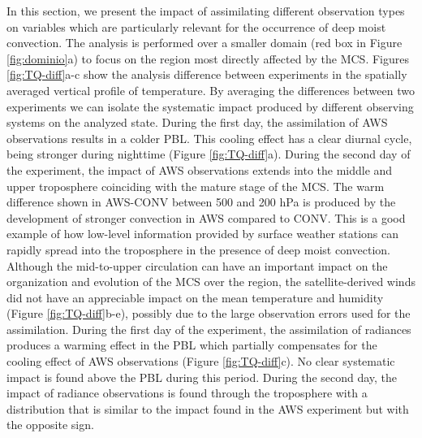 \documentclass[authoryear,preprint,review,12pt]{elsarticle} %
\begin{document}
In this section, we present the impact of assimilating different observation types on variables which are particularly relevant for the occurrence of deep moist convection. The analysis is performed over a smaller domain (red box in Figure \ref{fig:dominio}a) to focus on the region most directly affected by the MCS. Figures \ref{fig:TQ-diff}a-c show the analysis difference between experiments in the spatially averaged vertical profile of temperature. By averaging the differences between two experiments we can isolate the systematic impact produced by different observing systems on the analyzed state. During the first day, the assimilation of AWS observations results in a colder PBL. This cooling effect has a clear diurnal cycle, being stronger during nighttime (Figure \ref{fig:TQ-diff}a). During the second day of the experiment, the impact of AWS observations extends into the middle and upper troposphere coinciding with the mature stage of the MCS. The warm difference shown in AWS-CONV between 500 and 200 hPa is produced by the development of stronger convection in AWS compared to CONV. This is a good example of how low-level information provided by surface weather stations can rapidly spread into the troposphere in the presence of deep moist convection. Although the mid-to-upper circulation can have an important impact on the organization and evolution of the MCS over the region, the satellite-derived winds did not have an appreciable impact on the mean temperature and humidity (Figure \ref{fig:TQ-diff}b-e), possibly due to the large observation errors used for the assimilation.
During the first day of the experiment, the assimilation of radiances produces a warming effect in the PBL which partially compensates for the cooling effect of AWS observations (Figure \ref{fig:TQ-diff}c). No clear systematic impact is found above the PBL during this period. During the second day, the impact of radiance observations is found through the troposphere with a distribution that is similar to the impact found in the AWS experiment but with the opposite sign.
\end{document}
